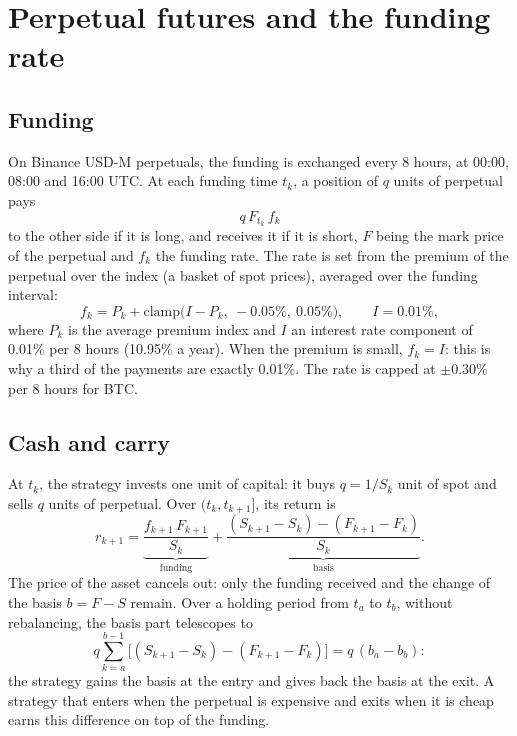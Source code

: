 \documentclass[11pt,a4paper]{article}
\begin{document}
\section{Perpetual futures and the funding rate}\label{sec:funding}

\subsection{Funding}
On Binance USD-M perpetuals, the funding is exchanged every 8 hours, at 00:00, 08:00 and 16:00 UTC. At each funding
time $t_k$, a position of $q$ units of perpetual pays
\begin{equation}
q\, F_{t_k}\, f_k
\end{equation}
to the other side if it is long, and receives it if it is short, $F$ being the mark price of the perpetual and $f_k$
the funding rate. The rate is set from the premium of the perpetual over the index (a basket of spot prices), averaged
over the funding interval:
\begin{equation}
f_k = P_k + \mathrm{clamp}\big(I - P_k,\ -0.05\%,\ 0.05\%\big), \qquad I = 0.01\%,
\end{equation}
where $P_k$ is the average premium index and $I$ an interest rate component of 0.01\% per 8 hours (10.95\% a year).
When the premium is small, $f_k = I$: this is why a third of the payments are exactly 0.01\%. The rate is capped at
$\pm 0.30\%$ per 8 hours for BTC.

\subsection{Cash and carry}
At $t_k$, the strategy invests one unit of capital: it buys $q = 1/S_k$ unit of spot and sells $q$ units of
perpetual. Over $(t_k, t_{k+1}]$, its return is
\begin{equation}
r_{k+1} = \underbrace{\frac{f_{k+1}\, F_{k+1}}{S_k}}_{\text{funding}}
+ \underbrace{\frac{(S_{k+1} - S_k) - (F_{k+1} - F_k)}{S_k}}_{\text{basis}} .
\label{eq:return}
\end{equation}
The price of the asset cancels out: only the funding received and the change of the basis $b = F - S$ remain. Over a
holding period from $t_a$ to $t_b$, without rebalancing, the basis part telescopes to
\begin{equation}
q \sum_{k=a}^{b-1} \big[(S_{k+1} - S_k) - (F_{k+1} - F_k)\big] = q\,(b_a - b_b):
\end{equation}
the strategy gains the basis at the entry and gives back the basis at the exit. A strategy that enters when the
perpetual is expensive and exits when it is cheap earns this difference on top of the funding.
\end{document}
